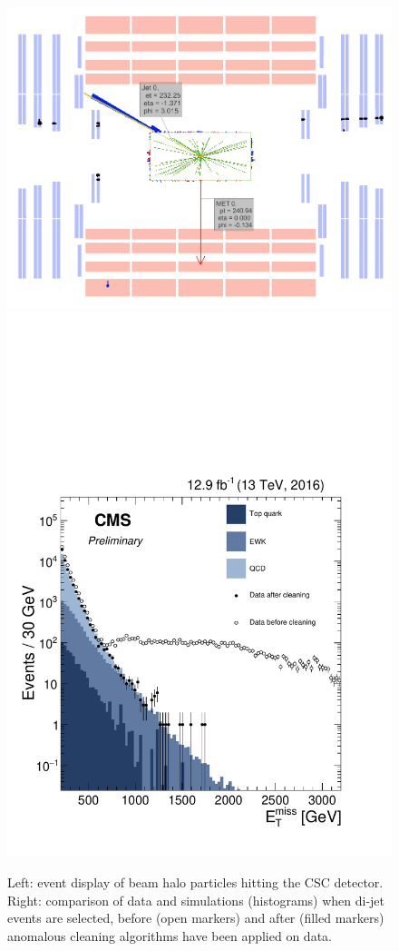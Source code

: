 \begin{figure}[!htb]
  \centering
    \includegraphics[width=.45\textwidth]{figures/MetPlots/BeamHalo_event_display.png}%
    \includegraphics[width=.35\textwidth]{figures/MetPlots/Filters.pdf}

  \caption{Left: event display of beam halo particles hitting the CSC detector. Right: comparison of data and simulations (histograms) when di-jet events are selected, before (open markers) and after (filled markers) anomalous \MET cleaning algorithms have been applied on data.}
  \label{fig:met_filters}
\end{figure}

